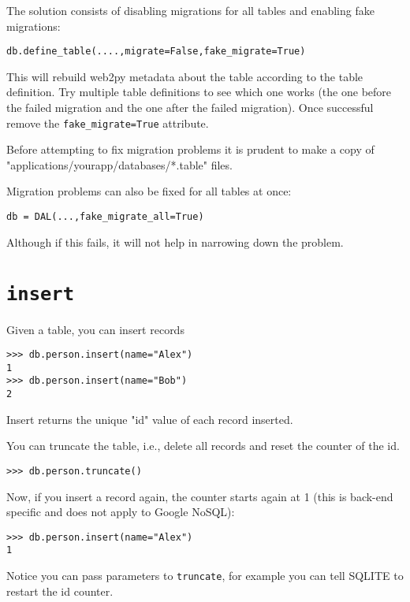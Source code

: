 \documentclass[justified,sixbynine,notoc]{tufte-book}
\def\ft{\small\tt}
\def\inxx#1{\index{#1}}
\begin{document}
\begin{fullwidth}
The solution consists of disabling migrations for all tables and enabling fake migrations:
\begin{lstlisting}
db.define_table(....,migrate=False,fake_migrate=True)
\end{lstlisting}

This will rebuild web2py metadata about the table according to the table definition. Try multiple table definitions to see which one works (the one before the failed migration and the one after the failed migration). Once successful remove the {\ft fake\_migrate=True} attribute.

Before attempting to fix migration problems it is prudent to make a copy of "applications/yourapp/databases/*.table" files.

Migration problems can also be fixed for all tables at once:

\begin{lstlisting}
db = DAL(...,fake_migrate_all=True)
\end{lstlisting}

Although if this fails, it will not help in narrowing down the problem.

\goodbreak\section{{\ft insert}}

Given a table, you can insert records

\inxx{insert}
\begin{lstlisting}
>>> db.person.insert(name="Alex")
1
>>> db.person.insert(name="Bob")
2
\end{lstlisting}

Insert returns the unique "id" value of each record inserted.

You can truncate the table, i.e., delete all records and reset the counter of the id.

\inxx{truncate}
\begin{lstlisting}
>>> db.person.truncate()
\end{lstlisting}

Now, if you insert a record again, the counter starts again at 1 (this is back-end specific and does not apply to Google NoSQL):
\begin{lstlisting}
>>> db.person.insert(name="Alex")
1
\end{lstlisting}

Notice you can pass parameters to {\ft truncate}, for example you can tell SQLITE to restart the id counter.


\end{fullwidth}
\end{document}
